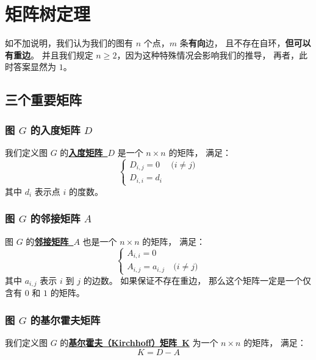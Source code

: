 \documentclass[UTF8]{article}
\begin{document}
	\section{矩阵树定理}

	如不加说明，我们认为我们的图有 $n$ 个点，$m$ 条\textbf{有向}边，
	且不存在自环，\textbf{但可以有重边}。
	并且我们规定 $n \ge 2$，因为这种特殊情况会影响我们的推导，
	再者，此时答案显然为 $1$。

	\subsection{三个重要矩阵}

	\subsubsection{图 $G$ 的入度矩阵 $D$}

	我们定义图 $G$ 的\textbf{\uline{入度矩阵~$D$}} 是一个 $n \times n$ 的矩阵，
	满足：
	\begin{equation*}
		\begin{cases}
			D_{i, j} = 0 & \pod {i \ne j}
			\\
			D_{i, i} = d_i
		\end{cases}
	\end{equation*}
	其中 $d_i$ 表示点 $i$ 的度数。

	\subsubsection{图 $G$ 的邻接矩阵 $A$}

	图 $G$ 的\textbf{\uline{邻接矩阵~$A$}} 也是一个 $n \times n$ 的矩阵，
	满足：
	\begin{equation*}
		\begin{cases}
			A_{i, i} = 0
			\\
			A_{i, j} = a_{i, j} & \pod {i \ne j}
		\end{cases}
	\end{equation*}
	其中 $a_{i, j}$ 表示 $i$ 到 $j$ 的边数。
	如果保证不存在重边，
	那么这个矩阵一定是一个仅含有 $0$ 和 $1$ 的矩阵。

	\subsubsection{图 $G$ 的基尔霍夫矩阵}

	我们定义图 $G$ 的\textbf{\uline{基尔霍夫（Kirchhoff）矩阵~K}}
	为一个 $n \times n$ 的矩阵，
	满足：
	$$
	K = D - A
	$$
\end{document}
